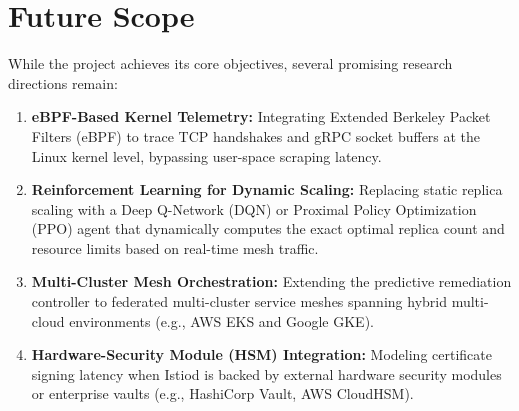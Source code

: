 \documentclass[12pt,a4paper]{report}
\begin{document}
\section{Future Scope}
While the project achieves its core objectives, several promising research directions remain:
\begin{enumerate}
    \item \textbf{eBPF-Based Kernel Telemetry:} Integrating Extended Berkeley Packet Filters (eBPF) to trace TCP handshakes and gRPC socket buffers at the Linux kernel level, bypassing user-space scraping latency.
    \item \textbf{Reinforcement Learning for Dynamic Scaling:} Replacing static replica scaling with a Deep Q-Network (DQN) or Proximal Policy Optimization (PPO) agent that dynamically computes the exact optimal replica count and resource limits based on real-time mesh traffic.
    \item \textbf{Multi-Cluster Mesh Orchestration:} Extending the predictive remediation controller to federated multi-cluster service meshes spanning hybrid multi-cloud environments (e.g., AWS EKS and Google GKE).
    \item \textbf{Hardware-Security Module (HSM) Integration:} Modeling certificate signing latency when Istiod is backed by external hardware security modules or enterprise vaults (e.g., HashiCorp Vault, AWS CloudHSM).
\end{enumerate}

\renewcommand{\bibname}{References}
\end{document}
